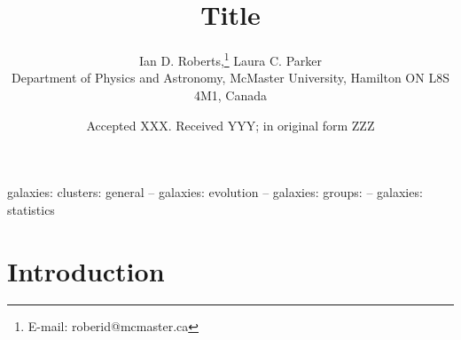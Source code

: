 \documentclass[a4paper,fleqn,usenatbib]{mnras}
\title[]{Title}
\author[I.D. Roberts \& L.C. Parker]{
Ian D. Roberts,\thanks{E-mail: roberid@mcmaster.ca}
Laura C. Parker
\\
Department of Physics and Astronomy, McMaster University, Hamilton ON
L8S 4M1, Canada
}
\date{Accepted XXX. Received YYY; in original form ZZZ}
\begin{document}
\label{firstpage}
\pagerange{\pageref{firstpage}--\pageref{lastpage}}
\maketitle

\begin{abstract}
\end{abstract}

\begin{keywords}
galaxies: clusters: general -- galaxies: evolution -- galaxies:
groups: -- galaxies: statistics
\end{keywords}



\section{Introduction}
\label{sec:introduction}
\end{document}
